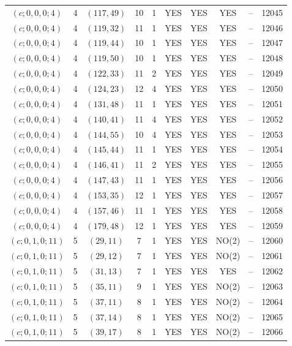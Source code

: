 \begin{longtable}{|c|c|c|c|c|c|c|c|c|c|}
$(c; 0, 0, 0; 4)$ & 4 & $(117, 49)$ & 10 & 1 & YES & YES & YES & -- & 12045\\
$(c; 0, 0, 0; 4)$ & 4 & $(119, 32)$ & 11 & 1 & YES & YES & YES & -- & 12046\\
$(c; 0, 0, 0; 4)$ & 4 & $(119, 44)$ & 10 & 1 & YES & YES & YES & -- & 12047\\
$(c; 0, 0, 0; 4)$ & 4 & $(119, 50)$ & 10 & 1 & YES & YES & YES & -- & 12048\\
$(c; 0, 0, 0; 4)$ & 4 & $(122, 33)$ & 11 & 2 & YES & YES & YES & -- & 12049\\
$(c; 0, 0, 0; 4)$ & 4 & $(124, 23)$ & 12 & 4 & YES & YES & YES & -- & 12050\\
$(c; 0, 0, 0; 4)$ & 4 & $(131, 48)$ & 11 & 1 & YES & YES & YES & -- & 12051\\
$(c; 0, 0, 0; 4)$ & 4 & $(140, 41)$ & 11 & 4 & YES & YES & YES & -- & 12052\\
$(c; 0, 0, 0; 4)$ & 4 & $(144, 55)$ & 10 & 4 & YES & YES & YES & -- & 12053\\
$(c; 0, 0, 0; 4)$ & 4 & $(145, 44)$ & 11 & 1 & YES & YES & YES & -- & 12054\\
$(c; 0, 0, 0; 4)$ & 4 & $(146, 41)$ & 11 & 2 & YES & YES & YES & -- & 12055\\
$(c; 0, 0, 0; 4)$ & 4 & $(147, 43)$ & 11 & 1 & YES & YES & YES & -- & 12056\\
$(c; 0, 0, 0; 4)$ & 4 & $(153, 35)$ & 12 & 1 & YES & YES & YES & -- & 12057\\
$(c; 0, 0, 0; 4)$ & 4 & $(157, 46)$ & 11 & 1 & YES & YES & YES & -- & 12058\\
$(c; 0, 0, 0; 4)$ & 4 & $(179, 48)$ & 12 & 1 & YES & YES & YES & -- & 12059\\
$(c; 0, 1, 0; 11)$ & 5 & $(29, 11)$ & 7 & 1 & YES & YES & NO(2) & -- & 12060\\
$(c; 0, 1, 0; 11)$ & 5 & $(29, 12)$ & 7 & 1 & YES & YES & NO(2) & -- & 12061\\
$(c; 0, 1, 0; 11)$ & 5 & $(31, 13)$ & 7 & 1 & YES & YES & YES & -- & 12062\\
$(c; 0, 1, 0; 11)$ & 5 & $(35, 11)$ & 9 & 1 & YES & YES & NO(2) & -- & 12063\\
$(c; 0, 1, 0; 11)$ & 5 & $(37, 11)$ & 8 & 1 & YES & YES & NO(2) & -- & 12064\\
$(c; 0, 1, 0; 11)$ & 5 & $(37, 14)$ & 8 & 1 & YES & YES & NO(2) & -- & 12065\\
$(c; 0, 1, 0; 11)$ & 5 & $(39, 17)$ & 8 & 1 & YES & YES & NO(2) & -- & 12066\\

\end{longtable}

